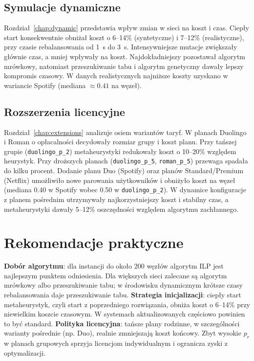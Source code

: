 \subsection{Symulacje dynamiczne}
Rozdział~\ref{chap:dynamic} przedstawia wpływ zmian w sieci na koszt i czas. Ciepły start konsekwentnie obniżał koszt o 6--14\% (syntetyczne) i 7--12\% (realistyczne), przy czasie rebalansowania od \SI{1}{\second} do \SI{3}{\second}. Intensywniejsze mutacje zwiększały głównie czas, a mniej wpływały na koszt. Najdokładniejszy pozostawał algorytm mrówkowy, natomiast przeszukiwanie tabu i algorytm genetyczny dawały lepszy kompromis czasowy. W danych realistycznych najniższe koszty uzyskano w wariancie Spotify (mediana $\approx 0.41$ na węzeł).

\subsection{Rozszerzenia licencyjne}
Rozdział~\ref{chap:extensions} analizuje osiem wariantów taryf. W planach Duolingo i Roman o opłacalności decydowały rozmiar grupy i koszt planu. Przy tańszej grupie (\texttt{duolingo\_p\_2}) metaheurystyki redukowały koszt o 10--20\% względem heurystyk. Przy droższych planach (\texttt{duolingo\_p\_5}, \texttt{roman\_p\_5}) przewaga spadała do kilku procent. Dodanie planu Duo (Spotify) oraz planów Standard/Premium (Netflix) umożliwiło nowe parowania użytkowników i obniżyło koszt na węzeł (mediana 0.40 w Spotify wobec 0.50 w \texttt{duolingo\_p\_2}). W dynamice konfiguracje z planem pośrednim utrzymywały najkorzystniejszy koszt i stabilny czas, a metaheurystyki dawały 5--12\% oszczędności względem algorytmu zachłannego.

\section{Rekomendacje praktyczne}

\textbf{Dobór algorytmu}: dla instancji do około 200 węzłów algorytm ILP jest najlepszym punktem odniesienia. Dla większych sieci zalecane są algorytm mrówkowy albo przeszukiwanie tabu; w środowisku dynamicznym krótsze czasy rebalansowania daje przeszukiwanie tabu.
\textbf{Strategia inicjalizacji}: ciepły start metaheurystyk, czyli start z poprzedniego rozwiązania, obniża koszt o 6--14\% przy niewielkim koszcie czasowym. W systemach aktualizowanych częściowo powinien to być standard.
\textbf{Polityka licencyjna}: tańsze plany rodzinne, w szczególności warianty pośrednie (np. Duo), realnie zmniejszają koszt końcowy. Zbyt wysokie $p_r$ w planach grupowych sprzyja licencjom indywidualnym i ogranicza zyski z optymalizacji.

